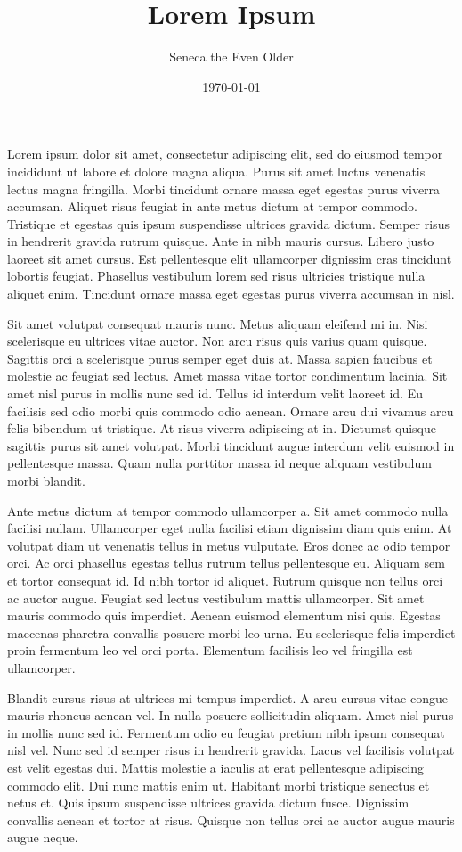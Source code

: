 \documentclass[11pt]{article}
\author{Seneca the Even Older}
\date{\today}
\title{Lorem Ipsum}
\begin{document}
\maketitle
\tableofcontents

Lorem ipsum dolor sit amet, consectetur adipiscing elit, sed do eiusmod tempor incididunt ut labore et dolore magna aliqua. Purus sit amet luctus venenatis lectus magna fringilla. Morbi tincidunt ornare massa eget egestas purus viverra accumsan. Aliquet risus feugiat in ante metus dictum at tempor commodo. Tristique et egestas quis ipsum suspendisse ultrices gravida dictum. Semper risus in hendrerit gravida rutrum quisque. Ante in nibh mauris cursus. Libero justo laoreet sit amet cursus. Est pellentesque elit ullamcorper dignissim cras tincidunt lobortis feugiat. Phasellus vestibulum lorem sed risus ultricies tristique nulla aliquet enim. Tincidunt ornare massa eget egestas purus viverra accumsan in nisl.

Sit amet volutpat consequat mauris nunc. Metus aliquam eleifend mi in. Nisi scelerisque eu ultrices vitae auctor. Non arcu risus quis varius quam quisque. Sagittis orci a scelerisque purus semper eget duis at. Massa sapien faucibus et molestie ac feugiat sed lectus. Amet massa vitae tortor condimentum lacinia. Sit amet nisl purus in mollis nunc sed id. Tellus id interdum velit laoreet id. Eu facilisis sed odio morbi quis commodo odio aenean. Ornare arcu dui vivamus arcu felis bibendum ut tristique. At risus viverra adipiscing at in. Dictumst quisque sagittis purus sit amet volutpat. Morbi tincidunt augue interdum velit euismod in pellentesque massa. Quam nulla porttitor massa id neque aliquam vestibulum morbi blandit.

Ante metus dictum at tempor commodo ullamcorper a. Sit amet commodo nulla facilisi nullam. Ullamcorper eget nulla facilisi etiam dignissim diam quis enim. At volutpat diam ut venenatis tellus in metus vulputate. Eros donec ac odio tempor orci. Ac orci phasellus egestas tellus rutrum tellus pellentesque eu. Aliquam sem et tortor consequat id. Id nibh tortor id aliquet. Rutrum quisque non tellus orci ac auctor augue. Feugiat sed lectus vestibulum mattis ullamcorper. Sit amet mauris commodo quis imperdiet. Aenean euismod elementum nisi quis. Egestas maecenas pharetra convallis posuere morbi leo urna. Eu scelerisque felis imperdiet proin fermentum leo vel orci porta. Elementum facilisis leo vel fringilla est ullamcorper.

Blandit cursus risus at ultrices mi tempus imperdiet. A arcu cursus vitae congue mauris rhoncus aenean vel. In nulla posuere sollicitudin aliquam. Amet nisl purus in mollis nunc sed id. Fermentum odio eu feugiat pretium nibh ipsum consequat nisl vel. Nunc sed id semper risus in hendrerit gravida. Lacus vel facilisis volutpat est velit egestas dui. Mattis molestie a iaculis at erat pellentesque adipiscing commodo elit. Dui nunc mattis enim ut. Habitant morbi tristique senectus et netus et. Quis ipsum suspendisse ultrices gravida dictum fusce. Dignissim convallis aenean et tortor at risus. Quisque non tellus orci ac auctor augue mauris augue neque.
\end{document}
